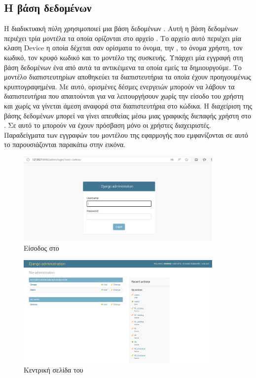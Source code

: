 \subsection{Η βάση δεδομένων}
Η διαδικτυακή πύλη χρησιμοποιεί μια βάση δεδομένων . Αυτή η βάση δεδομένων περιέχει τρία
μοντέλα τα οποία ορίζονται στο αρχείο . Το αρχείο αυτό περιέχει μία κλαση Device η οποία δέχεται σαν ορίσματα
το όνομα, την , το όνομα χρήστη, τον κωδικό, τον κρυφό κωδικό και το μοντέλο της συσκευής.
Υπάρχει μία εγγραφή στη βάση δεδομένων ένα από αυτά τα αντικέιμενα τα οποία εμείς τα δημιουργούμε. Το μοντέλο διαπιστευτηρίων αποθηκεύει τα διαπιστευτήρια τα οποία έχουν προηγουμένως
κρυπτογραφημένα. Με αυτό, ορισμένες δέσμες ενεργειών μπορούν να λάβουν τα διαπιστευτήρια που απαιτούνται για να λειτουργήσουν
χωρίς την είσοδο του χρήστη και χωρίς να γίνεται άμεση αναφορά στα διαπιστευτήρια στο
κώδικα.
Η διαχείριση της βάσης δεδομένων μπορεί να γίνει απευθείας μέσω μιας γραφικής διεπαφής χρήστη
 στο . Σε αυτό το  μπορούν να έχουν πρόσβαση μόνο οι χρήστες διαχειριστές. Παραδείγματα
των εγγραφών του μοντέλου της εφαρμογής  που εμφανίζονται σε αυτό το  παρουσιάζονται παρακάτω στην εικόνα.

\begin{figure}[htb]
	\centering
	\includegraphics[width=0.9\textwidth]{graphics/GUI_LOGIN.png}
	\caption{Είσοδος στο }
\end{figure}

\begin{figure}[htb]
	\centering
	\includegraphics[width=0.9\textwidth]{graphics/DJANGO_ADMIN.png}
	\caption{Κεντρική σελίδα του }
\end{figure}

